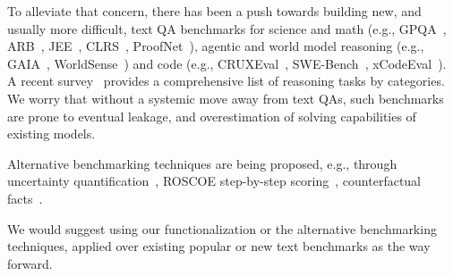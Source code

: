 \documentclass[11pt,a4paper]{article}
\begin{document}
To alleviate that concern, there has been a push towards building new, and
usually more difficult, text QA benchmarks for science and math (e.g.,
GPQA~\cite{gpqa}, ARB~\cite{arb}, JEE~\cite{jee}, CLRS~\cite{clrs}, ProofNet~\cite{proofnet}), agentic and world model reasoning (e.g.,
GAIA~\cite{gaia}, WorldSense~\cite{worldsense}) and code (e.g.,
CRUXEval~\cite{cruxeval}, SWE-Bench~\cite{swe-bench}, xCodeEval~\cite{xcodeeval}).
A recent survey~\cite{survey-reasoning} provides a comprehensive list of
reasoning tasks by categories.
We worry that without a
systemic move away from text QAs, such benchmarks are prone to eventual
leakage, and overestimation of solving capabilities of existing models.

Alternative benchmarking techniques are being proposed, e.g., through
uncertainty quantification~\cite{uncertainity-quant}, ROSCOE step-by-step scoring~\cite{roscoe},
counterfactual facts~\cite{counterfactual}.

We would suggest using our functionalization or the alternative benchmarking
techniques, applied over existing popular or new text benchmarks as the way
forward.
\end{document}
